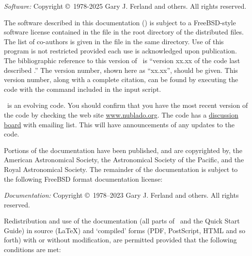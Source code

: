 {\small
\noindent
{\em Software:} Copyright \copyright\ 1978-2025 Gary J. Ferland and others. All rights reserved.

\vspace{1em}

\noindent
The software described in this documentation (\Cloudy) is subject
to a FreeBSD-style software license
contained in the file  in the
root directory of the distributed files.
The list of co-authors is given in the file
 in the same directory.
Use of this program is not restricted provided each use is
acknowledged upon publication.
The bibliographic reference to this version of \Cloudy\ is
``version xx.xx
of the code last described \citet{CloudyReview}.''
The version number, shown here as ``xx.xx'', should be
given.
This version number, along with a complete citation,
can be found by executing the code with the 
 command included in the input script.

\vspace{1em}

\noindent
\Cloudy\ is an evolving code.
You should confirm that you have the most recent
version of the code by checking the web site
\href{http://www.nublado.org}{www.nublado.org}.
The code has a
\href{https://cloudyastrophysics.groups.io}{discussion board} with emailing list.
This will have announcements of any updates to the code.\par

\vspace{1em}

\noindent
Portions of the documentation have been published, and are copyrighted by, the
American Astronomical Society, the Astronomical Society of the Pacific, and
the Royal Astronomical Society. The remainder of the documentation is subject
to the following FreeBSD format documentation license:

\vspace{1em}

\noindent
\iffalse The string 1978-20?? is updated using sed. do not change - to -- \fi
{\em Documentation:} Copyright \copyright\ 1978--2023 Gary J. Ferland and others. All rights reserved.

\vspace{1em}

\noindent
Redistribution and use of the documentation (all parts of \Hazy\ and the
Quick Start Guide) in source (\LaTeX) and `compiled' forms (PDF, PostScript,
HTML and so forth) with or without modification, are permitted provided that
the following conditions are met:

}

